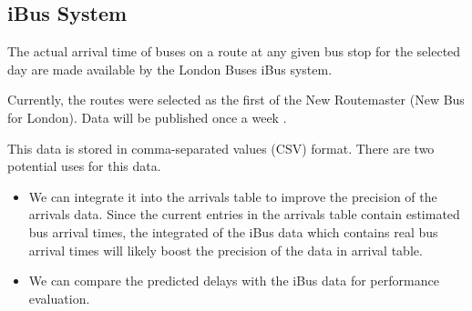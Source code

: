 \subsection{iBus System}
The actual arrival time of buses on a route at any given bus stop for the selected day are made available by the London Buses iBus system.

Currently, the routes were selected as the first of the New Routemaster (New Bus for London). Data will be published once a week \cite{buses_performance_data}.

This data is stored in comma-separated values (CSV) format. There are two potential uses for this data.
\begin{itemize}
	\item We can integrate it into the arrivals table to improve the precision of the arrivals data. Since the current entries in the arrivals table contain estimated bus arrival times, the integrated of the iBus data which contains real bus arrival times will likely boost the precision of the data in arrival table.
	\item We can compare the predicted delays with the iBus data for performance evaluation.
\end{itemize}
